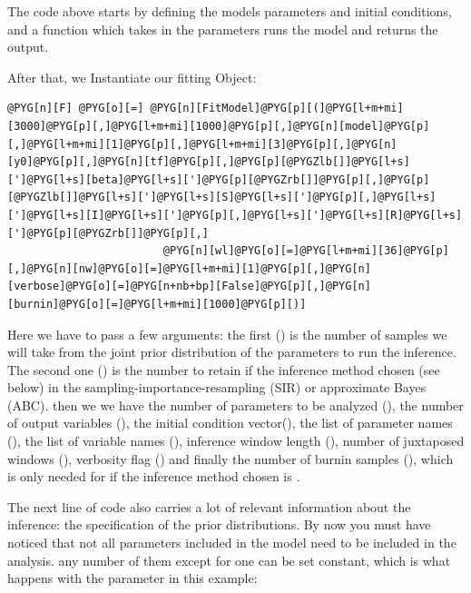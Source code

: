 \documentclass[a4paper,10pt,english]{manual}
\begin{document}
The code above starts by defining the models parameters and initial conditions, and a function which takes in the parameters runs the model and returns the output.

After that, we Instantiate our fitting Object:

\begin{Verbatim}[commandchars=@\[\]]
@PYG[n][F] @PYG[o][=] @PYG[n][FitModel]@PYG[p][(]@PYG[l+m+mi][3000]@PYG[p][,]@PYG[l+m+mi][1000]@PYG[p][,]@PYG[n][model]@PYG[p][,]@PYG[l+m+mi][1]@PYG[p][,]@PYG[l+m+mi][3]@PYG[p][,]@PYG[n][y0]@PYG[p][,]@PYG[n][tf]@PYG[p][,]@PYG[p][@PYGZlb[]]@PYG[l+s][']@PYG[l+s][beta]@PYG[l+s][']@PYG[p][@PYGZrb[]]@PYG[p][,]@PYG[p][@PYGZlb[]]@PYG[l+s][']@PYG[l+s][S]@PYG[l+s][']@PYG[p][,]@PYG[l+s][']@PYG[l+s][I]@PYG[l+s][']@PYG[p][,]@PYG[l+s][']@PYG[l+s][R]@PYG[l+s][']@PYG[p][@PYGZrb[]]@PYG[p][,]
                        @PYG[n][wl]@PYG[o][=]@PYG[l+m+mi][36]@PYG[p][,]@PYG[n][nw]@PYG[o][=]@PYG[l+m+mi][1]@PYG[p][,]@PYG[n][verbose]@PYG[o][=]@PYG[n+nb+bp][False]@PYG[p][,]@PYG[n][burnin]@PYG[o][=]@PYG[l+m+mi][1000]@PYG[p][)]
\end{Verbatim}

Here we have to pass a few arguments: the first () is the number of samples we will take from the joint prior distribution of the parameters to run the inference. The second one () is the number to retain if the inference method chosen (see below) in the sampling-importance-resampling (SIR) or approximate Bayes (ABC). then we we have the number of parameters to be analyzed (), the number of output variables (), the initial condition vector(), the list of parameter names (), the list of variable names (), inference window length (), number of juxtaposed windows (), verbosity flag () and finally the number of burnin samples (), which is only needed for if the inference method chosen is .

The next line of code also carries a lot of relevant information about the inference: the specification of the prior distributions. By now you must have noticed that not all parameters included in the model need to be included in the analysis. any number of them except for one can be set constant, which is what happens with the parameter  in this example:
\end{document}
